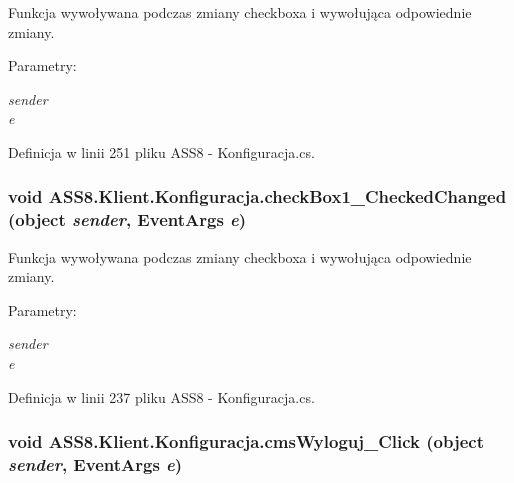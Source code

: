Funkcja wywoływana podczas zmiany checkboxa i wywołująca odpowiednie zmiany. 

\begin{Desc}
\item[Parametry:]
\begin{description}
\item[{\em sender}]\item[{\em e}]\end{description}
\end{Desc}


Definicja w linii 251 pliku ASS8 - Konfiguracja.cs.\hypertarget{a00014_9fae1354592491cc868938a644d08225}{
\subsubsection[{checkBox1\_\-CheckedChanged}]{\setlength{\rightskip}{0pt plus 5cm}void ASS8.Klient.Konfiguracja.checkBox1\_\-CheckedChanged (object {\em sender}, \/  EventArgs {\em e})}}
\label{d2/de7/a00014_9fae1354592491cc868938a644d08225}


Funkcja wywoływana podczas zmiany checkboxa i wywołująca odpowiednie zmiany. 

\begin{Desc}
\item[Parametry:]
\begin{description}
\item[{\em sender}]\item[{\em e}]\end{description}
\end{Desc}


Definicja w linii 237 pliku ASS8 - Konfiguracja.cs.\hypertarget{a00014_320235785478082ecc1aa03461bf2784}{
\subsubsection[{cmsWyloguj\_\-Click}]{\setlength{\rightskip}{0pt plus 5cm}void ASS8.Klient.Konfiguracja.cmsWyloguj\_\-Click (object {\em sender}, \/  EventArgs {\em e})}}
\label{d2/de7/a00014_320235785478082ecc1aa03461bf2784}


